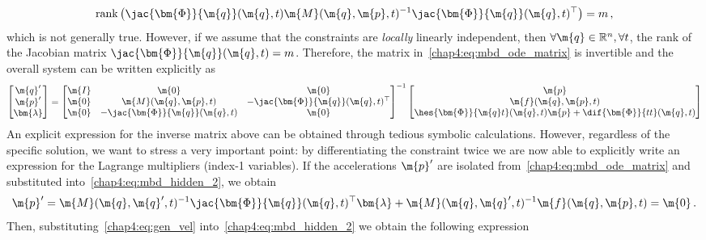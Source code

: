 %
\begin{equation}
  \mathrm{rank}\left( \jac{\bm{\Phi}}{\m{q}}(\m{q}, t) \m{M}(\m{q}, \m{p}, t)^{-1} \jac{\bm{\Phi}}{\m{q}}(\m{q}, t)^{\top}\right) = m \, \text{,}
  \label{chap4:eq:compression}
\end{equation}
%
which is not generally true. However, if we assume that the constraints are \emph{locally} linearly independent, then $\forall\m{q}\in\mathbb{R}^{n},\forall t$, the rank of the Jacobian matrix $\jac{\bm{\Phi}}{\m{q}}(\m{q}, t) = m$. Therefore, the matrix in~\eqref{chap4:eq:mbd_ode_matrix} is invertible and the overall system can be written explicitly as
%
\begin{equation*}
  \begin{bmatrix}
    \m{q}^{\prime} \\ \m{p}^{\prime} \\ \bm{\lambda}
  \end{bmatrix} = \begin{bmatrix}
    \m{I} & \m{0} & \m{0} \\
    \m{0} & \m{M}(\m{q}, \m{p}, t) & -\jac{\bm{\Phi}}{\m{q}}(\m{q}, t)^{\top} \\
    \m{0} & -\jac{\bm{\Phi}}{\m{q}}(\m{q}, t) & \m{0}
  \end{bmatrix}^{-1}
  \begin{bmatrix}
    \m{p} \\
    \m{f}(\m{q},\m{p},t) \\
    \hes{\bm{\Phi}}{\m{q}t}(\m{q}, t)\m{p} + \dif{\bm{\Phi}}{tt}(\m{q}, t)
  \end{bmatrix}
\end{equation*}
%
An explicit expression for the inverse matrix above can be obtained through tedious symbolic calculations. However, regardless of the specific solution, we want to stress a very important point: by differentiating the constraint twice we are now able to explicitly write an expression for the Lagrange multipliers (index-1 variables). If the accelerations $\m{p}^{\prime}$ are isolated from~\eqref{chap4:eq:mbd_ode_matrix} and substituted into~\eqref{chap4:eq:mbd_hidden_2}, we obtain
%
\begin{equation}
  \m{p}^{\prime} = \m{M}(\m{q}, \m{q}^{\prime}, t)^{-1} \jac{\bm{\Phi}}{\m{q}}(\m{q}, t)^{\top}\bm{\lambda} + \m{M}(\m{q}, \m{q}^{\prime}, t)^{-1}\m{f}(\m{q},\m{p},t) = \m{0} \, \text{.}
  \label{chap4:eq:gen_vel}
\end{equation}
%
Then, substituting~\eqref{chap4:eq:gen_vel} into~\eqref{chap4:eq:mbd_hidden_2} we obtain the following expression
